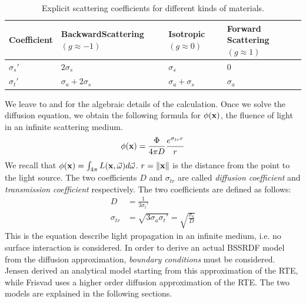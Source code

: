 \renewcommand{\arraystretch}{1.8}
\begin{table}[!ht]
    \centering
    \begin{tabularx}{0.95\textwidth}{|X|X|X|X|}
    \hline
    Coefficient   & Backward\linebreak Scattering \linebreak $(g \approx -1)$ & Isotropic \linebreak\linebreak $(g \approx 0)$ & Forward \linebreak Scattering \linebreak $(g \approx 1)$ \\ \hline
    $\sigma_s'$   & $2 \sigma_s$ & $\sigma_s$ & 0   \\ \hline
    $\sigma_t'$   & $\sigma_a + 2 \sigma_s$ & $\sigma_a + \sigma_s$ &  $\sigma_a$  \\ \hline
    \end{tabularx}
\caption{Explicit scattering coefficients for different kinds of materials.}
\label{table:coefficients}
\end{table}

We leave to \cite{books/daglib/0093591} and \cite{Jensen:2001:PMS:383259.383319} for the algebraic details of the calculation. Once we solve the diffusion equation, we obtain the following formula for $\phi(\mathbf{x})$, the fluence of light in an infinite scattering medium.
\begin{equation}
\phi(\mathbf{x}) = \frac{\Phi}{4\pi D} \frac{e^{\sigma_{tr} r}}{r}
\label{eq:dasimple}
\end{equation}
We recall that $\phi(\mathbf{x}) = \int_{4\pi}L(\mathbf{x},\vec{\omega}) d\vec{\omega}$. $r = \|\mathbf{x}\|$ is the distance from the point to the light source. The two coefficients $D$ and $\sigma_{tr}$ are called \emph{diffusion coefficient} and \emph{transmission coefficient} respectively. The two coefficients are defined as follows:
\begin{equation*}
\begin{split}
D &= \frac{1}{3 \sigma_t'} \\
\sigma_{tr} &= \sqrt{3 \sigma_a \sigma_t'} = \sqrt{\frac{\sigma_a}{D}}
\end{split}
\end{equation*}
This is the equation describe light propagation in an infinite medium, i.e. no surface interaction is considered. In order to derive an actual BSSRDF model from the diffusion approximation, \emph{boundary conditions} must be considered. Jensen \cite{Jensen:2001:PMS:383259.383319} derived an analytical model starting from this approximation of the RTE, while Frisvad \cite{IMM2013-06646} uses a higher order diffusion approximation of the RTE. The two models are explained in the following sections.

